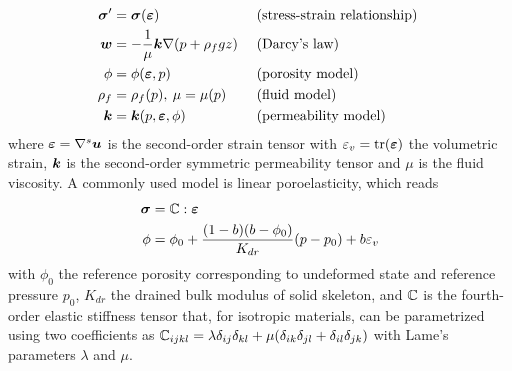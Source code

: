 \begin{align}
    \bm{\sigma}^\prime &= \bm{\sigma}(\bm{\varepsilon})  & & \mbox{ (stress-strain relationship) } \label{eq:constitutive_stress} \\
    \bm{w} &= - \frac{1}{\mu}\bm{k}\nabla(p + \rho_f g z) & & \mbox{ (Darcy's law) } \label{eq:constitutive_darcy} \\
    \phi &= \phi(\bm{\varepsilon}, p) & & \mbox{ (porosity model) } \label{eq:constitutive_porosity} \\
    \rho_f &= \rho_f(p), \: \mu = \mu(p) & & \mbox{ (fluid model) } \label{eq:constitutive_fluid} \\
    \bm{k} &= \bm{k}(p,\bm{\varepsilon},\phi) & & \mbox{ (permeability model) } \label{eq:constitutive_permeability}
\end{align}
where $\bm{\varepsilon} = \nabla^s \bm{u}$ is the second-order strain tensor with $\varepsilon_v = \operatorname{tr}(\bm{\varepsilon})$ the volumetric strain, $\bm{k}$ is the second-order symmetric permeability tensor and $\mu$ is the fluid viscosity.   A commonly used model is linear poroelasticity, which reads
\begin{align}
    \bm{\sigma} &= \mathbb{C} : \bm{\varepsilon} \\
    \phi &= \phi_0 + \frac{(1 - b)(b - \phi_0)}{K_{dr}}(p - p_0) + b\varepsilon_v \\
\end{align}
with $\phi_0$ the reference porosity corresponding to undeformed state and reference pressure $p_0$, $K_{dr}$ the drained bulk modulus of solid skeleton, and $\mathbb{C}$ is the fourth-order elastic stiffness tensor that, for isotropic materials, can be parametrized using two coefficients as $\mathbb{C}_{ijkl} = \lambda \delta_{ij} \delta_{kl} + \mu(\delta_{ik} \delta_{jl} + \delta_{il} \delta_{jk})$ with Lame's parameters $\lambda$ and $\mu$.

